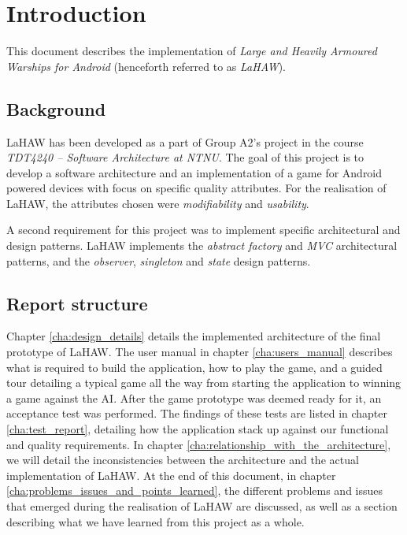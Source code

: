 \chapter{Introduction}

This document describes the implementation of \emph{Large and Heavily Armoured Warships for Android} (henceforth referred to as \emph{LaHAW}). 




\section{Background}

LaHAW has been developed as a part of Group A2's project in the course \emph{TDT4240 – Software Architecture at NTNU}. The goal of this project is to develop a software architecture and an implementation of a game for Android powered devices with focus on specific quality attributes. For the realisation of LaHAW, the attributes chosen were \emph{modifiability} and \emph{usability}.

A second requirement for this project was to implement specific architectural and design patterns. LaHAW implements the \emph{abstract factory} and \emph{MVC} architectural patterns, and the \emph{observer}, \emph{singleton} and \emph{state} design patterns.



\section{Report structure}

Chapter \ref{cha:design_details} details the implemented architecture of the final prototype of LaHAW.
The user manual in chapter \ref{cha:users_manual} describes what is required to build the application, how to play the game, and a guided tour detailing a typical game all the way from starting the application to winning a game against the AI.
After the game prototype was deemed ready for it, an acceptance test was performed. The findings of these tests are listed in chapter \ref{cha:test_report}, detailing how the application stack up against our functional and quality requirements.
In chapter \ref{cha:relationship_with_the_architecture}, we will detail the inconsistencies between the architecture and the actual implementation of LaHAW.
At the end of this document, in chapter \ref{cha:problems_issues_and_points_learned}, the different problems and issues that emerged during the realisation of LaHAW are discussed, as well as a section describing what we have learned from this project as a whole.
